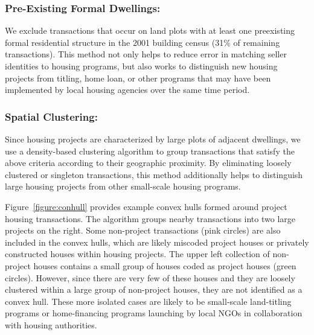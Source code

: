 \documentclass[12pt]{article}
\begin{document}
\subsubsection{Pre-Existing Formal Dwellings:}  


We exclude transactions that occur on land plots with at least one preexisting formal residential structure in the 2001 building census (31\% of remaining transactions).  This method not only helps to reduce error in matching seller identities to housing programs, but also works to distinguish new housing projects from titling, home loan, or other programs that may have been implemented by local housing agencies over the same time period.   

\subsubsection{Spatial Clustering:}  Since housing projects are characterized by large plots of adjacent dwellings, we use a density-based clustering algorithm to group transactions that satisfy the above criteria according to their geographic proximity.  By eliminating loosely clustered or singleton transactions, this method additionally helps to distinguish large housing projects from other small-scale housing programs.  

Figure~\ref{figure:conhull} provides example convex hulls formed around project housing transactions.  The algorithm groups nearby transactions into two large projects on the right.  Some non-project transactions (pink circles) are also included in the convex hulls, which are likely miscoded project houses or privately constructed houses within housing projects.  The upper left collection of non-project houses contains a small group of houses coded as project houses (green circles).  However, since there are very few of these houses and they are loosely clustered within a large group of non-project houses, they are not identified as a convex hull.  These more isolated cases are likely to be small-scale land-titling programs or home-financing programs launching by local NGOs in collaboration with housing authorities.  
\end{document}
